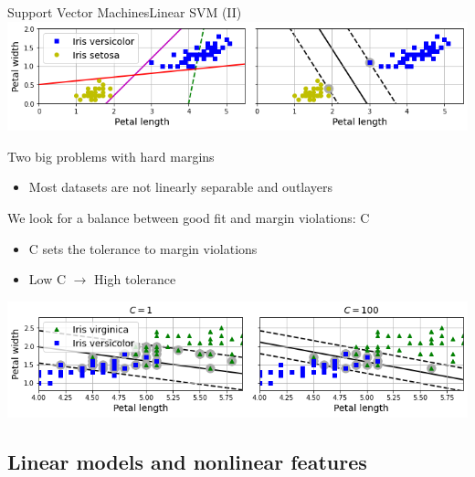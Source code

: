 \documentclass[10pt,compress]{beamer} %
\begin{document}
\begin{frame}{Support Vector Machines}{Linear SVM (II)}
    \centering \includegraphics[width=0.8\linewidth]{figs/svm-linear.png}\\
    \flushleft

    Two big problems with hard margins
    \begin{itemize}
        \item Most datasets are not linearly separable and outlayers
    \end{itemize}

    We look for a balance between good fit and margin violations: C
    \begin{itemize}
        \item C sets the tolerance to margin violations
        \item Low C $\rightarrow$ High tolerance
    \end{itemize}

    \centering \includegraphics[width=0.8\linewidth]{figs/svm-c.png}
\end{frame}

\subsection{Linear models and nonlinear features}
\end{document}
